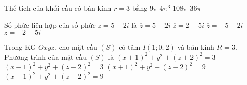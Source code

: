 \begin{ex}%
	Thể tích của khối cầu có bán kính $r=3$ bằng
	\choice
	{$9\pi$}
	{$4\pi^3$}
	{$108\pi$}
	{\True $36\pi$}
\end{ex}

\begin{ex}%
	Số phức liên hợp của số phức $z=5-2i$ là
	\choice
	{\True $\overline{z}=5+2i$}
	{$\overline{z}=2+5i$}
	{$\overline{z}=-5-2i$}
	{$\overline{z}=-2-5i$}
\end{ex}

\begin{ex}%
	Trong KG $Oxyz$, cho mặt cầu $(S)$ có tâm $I(1;0;2)$ và bán kính $R=3$. Phương trình của mặt cầu $(S)$ là 
	\choice
	{$(x+1)^2+y^2+(z+2)^2=3$}
	{$(x-1)^2+y^2+(z-2)^2=3$}
	{$(x+1)^2+y^2+(z-2)^2=9$}
	{\True $(x-1)^2+y^2+(z-2)^2=9$}
\end{ex}

